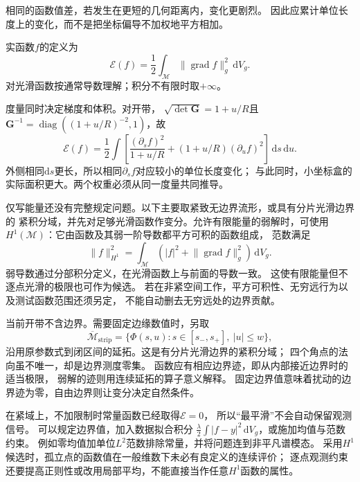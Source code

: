 相同的函数值差，若发生在更短的几何距离内，变化更剧烈。
因此应累计单位长度上的变化，而不是把坐标偏导不加权地平方相加。
\begin{definition}[Dirichlet能量]
\label{def:geometry-dirichlet-energy}
实函数$f$的定义为
\begin{equation}
 \mathcal E(f)=\frac12\int_{\mathcal M}
       \lVert\operatorname{grad}f\rVert_g^2\,\mathrm dV_g.
 \label{eq:geometry-dirichlet-energy}
\end{equation}
对光滑函数按通常导数理解；积分不有限时取$+\infty$。
\end{definition}
度量同时决定梯度和体积。对开带，
$\sqrt{\det\bm G}=1+u/R$且
$\bm G^{-1}=\operatorname{diag}((1+u/R)^{-2},1)$，故
\begin{equation}
 \mathcal E(f)=\frac12\int
 \left[\frac{(\partial_sf)^2}{1+u/R}
       +(1+u/R)(\partial_uf)^2\right]\,\mathrm ds\,\mathrm du.
 \label{eq:geometry-strip-dirichlet-energy}
\end{equation}
外侧相同$\mathrm ds$更长，所以相同$\partial_sf$对应较小的单位长度变化；
与此同时，小坐标盒的实际面积更大。两个权重必须从同一度量共同推导。

仅写能量还没有完整规定问题。以下主要取紧致无边界流形，或具有分片光滑边界的
紧积分域，并先对足够光滑函数作变分。允许有限能量的弱解时，可使用
$H^1(\mathcal M)$：它由函数及其弱一阶导数都平方可积的函数组成，
范数满足
\[
 \lVert f\rVert_{H^1}^2
 =\int_{\mathcal M}(|f|^2+\lVert\operatorname{grad}f\rVert_g^2)\,\mathrm dV_g.
\]
弱导数通过分部积分定义，在光滑函数上与前面的导数一致。
这使有限能量但不逐点光滑的极限也可作为候选。
若在非紧空间工作，平方可积性、无穷远行为以及测试函数范围还须另定，
不能自动删去无穷远处的边界贡献。

当前开带不含边界。需要固定边缘数值时，另取
\[
 \overline{\mathcal M}_{\mathrm{strip}}
 =\{\Phi(s,u):s\in[s_-,s_+],\ |u|\leq w\},
\]
沿用原参数式到闭区间的延拓。这是有分片光滑边界的紧积分域；
四个角点的法向虽不唯一，却是边界测度零集。
函数应有相应边界迹，即从内部接近边界时的适当极限，
弱解的迹则用连续延拓的算子意义解释。
固定边界值意味着扰动的边界迹为零，自由边界则让变分决定自然条件。

在紧域上，不加限制时常量函数已经取得$\mathcal E=0$，
所以“最平滑”不会自动保留观测信号。
可以规定边界值，加入数据拟合积分
$\frac{\lambda}{2}\int|f-y|^2\,\mathrm dV_g$，或施加均值与范数约束。
例如零均值加单位$L^2$范数排除常量，并将问题连到非平凡谱模态。
采用$H^1$候选时，孤立点的函数值在一般维数下未必有良定义的连续评价；
逐点观测约束还要提高正则性或改用局部平均，不能直接当作任意$H^1$函数的属性。

